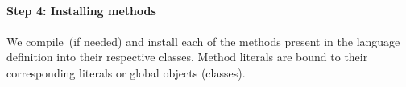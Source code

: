 


\paragraph{\textbf{Step 4: Installing methods}}

We compile~(if needed) and install each of the methods present in the language definition into their respective classes. Method literals are bound to their corresponding literals or global objects (\eg classes).



